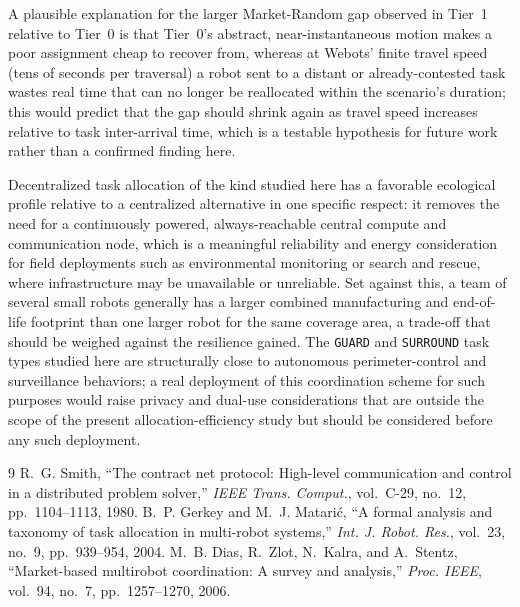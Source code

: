 \documentclass[conference]{IEEEtran}
\begin{document}
A plausible explanation for the larger Market-Random gap observed in
Tier~1 relative to Tier~0 is that Tier~0's abstract, near-instantaneous
motion makes a poor assignment cheap to recover from, whereas at Webots'
finite travel speed (tens of seconds per traversal) a robot sent to a
distant or already-contested task wastes real time that can no longer be
reallocated within the scenario's duration; this would predict that the
gap should shrink again as travel speed increases relative to task
inter-arrival time, which is a testable hypothesis for future work rather
than a confirmed finding here.

Decentralized task allocation of the kind studied here has a favorable
ecological profile relative to a centralized alternative in one specific
respect: it removes the need for a continuously powered, always-reachable
central compute and communication node, which is a meaningful reliability
and energy consideration for field deployments such as environmental
monitoring or search and rescue, where infrastructure may be unavailable
or unreliable. Set against this, a team of several small robots
generally has a larger combined manufacturing and end-of-life footprint
than one larger robot for the same coverage area, a trade-off that should
be weighed against the resilience gained. The \texttt{GUARD} and
\texttt{SURROUND} task types studied here are structurally close to
autonomous perimeter-control and surveillance behaviors; a real
deployment of this coordination scheme for such purposes would raise
privacy and dual-use considerations that are outside the scope of the
present allocation-efficiency study but should be considered before any
such deployment.

\begin{thebibliography}{9}
 R.~G. Smith, ``The contract net protocol: High-level
communication and control in a distributed problem solver,'' \emph{IEEE
Trans. Comput.}, vol.~C-29, no.~12, pp.~1104--1113, 1980.
 B.~P. Gerkey and M.~J. Matari\'c, ``A formal analysis
and taxonomy of task allocation in multi-robot systems,'' \emph{Int. J.
Robot. Res.}, vol.~23, no.~9, pp.~939--954, 2004.
 M.~B. Dias, R.~Zlot, N.~Kalra, and A.~Stentz,
``Market-based multirobot coordination: A survey and analysis,''
\emph{Proc. IEEE}, vol.~94, no.~7, pp.~1257--1270, 2006.
\end{thebibliography}

\onecolumn
\appendix
\end{document}
